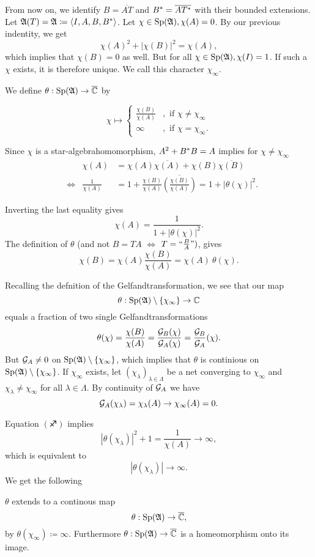 \documentclass[a4paper,10pt]{article}
\begin{document}
From now on, we identify $B=\overline{AT}$ and $B^{*} =\overline{AT^{*}}$  with their bounded extensions.
Let $\mathfrak{A} (T) = \mathfrak{A} \coloneqq \left\langle I, A, B , B^{*} \right\rangle$. Let $ \chi \in \operatorname{Sp} (\mathfrak{A}), \chi(A) =0$. By our previous indentity, we get
\[
 \chi(A)^2 + |\chi(B)|^2 = \chi(A),
\]
which implies that $\chi(B) =0$ as well. But for all $\chi \in \operatorname{Sp} (\mathfrak{A}), \chi(I)=1$. If such a $\chi$ exists, it is therefore unique. We call this character $\chi_\infty$.

We define $\theta : \operatorname{Sp} (\mathfrak{A}) \to \overline{\mathbb{C}}$ by

 \[
 \chi \mapsto 
  \begin{cases}
    \frac{\chi(B)}{\chi(A)} &, \text{ if }\chi \neq \chi_\infty\\
    \infty &, \text{ if } \chi = \chi_\infty.
    \end{cases}
 \]
 
 Since $\chi$ is a star-algebrahomomorphism, $A^2 + B^{*} B = A$ implies for $\chi \neq \chi_\infty$
 \begin{align*}
  &  & \chi(A) &= \chi(A) \overline{\chi(A)} + \chi(B) \overline{\chi(B)} \\
  &\Leftrightarrow& \frac{1}{\chi(A)} &= 1 + \frac{\chi(B)}{\chi(A)} \overline{\left( \frac{\chi(B)}{\chi(A)} \right)} = 1 + | \theta(\chi)|^2. 
 \end{align*}

Inverting the last equality gives
\[
 \chi(A) = \frac{1}{1 + |\theta (\chi)|^2} \tag{\blankone}.
\]
The definition of $\theta$ (and not $B= TA$ $\Leftrightarrow$ $T = `` \frac{B}{A} ")$, gives
\[
 \chi(B) = \chi(A) \frac{\chi(B)}{\chi(A)}= \chi(A)~ \theta(\chi) \tag{\blanktwo}.
\]

Recalling the defnition of the Gelfandtransformation, we see that our map
\[
 \theta : \operatorname{Sp}(\mathfrak{A}) \setminus \{\chi_\infty\} \to \mathbb{C}
\]
equals a fraction of two single Gelfandtransformations
\[
 \theta(\chi) = \frac{\chi(B)}{\chi(A)} = \frac{\mathcal{G}_B (\chi)}{\mathcal{G}_A (\chi)}= \frac{\mathcal{G}_B}{\mathcal{G}_A}(\chi).
\]
But $\mathcal{G}_A \neq 0$ on $\operatorname{Sp}(\mathfrak{A}) \setminus \{\chi_\infty\}$, which implies that $\theta$ is continious on $\operatorname{Sp}(\mathfrak{A}) \setminus \{\chi_\infty\}$.
If $\chi_\infty$ exists, let $ \left( \chi_\lambda \right) _{\lambda \in \Lambda}$ be a net converging to $\chi_\infty$ and $\chi_\lambda \neq \chi_\infty$ for all $\lambda \in \Lambda$. By continuity of $\mathcal{G}_A$ we have
\[
 \mathcal{G}_A (\chi_\lambda) = \chi_\lambda (A) \to \chi_\infty (A) = 0.
\]

Equation $(\sagittarius)$ implies
\[
 | \theta( \chi_\lambda ) | ^2  + 1 = \frac{1}{\chi(A)} \to \infty,
\]
which is equivalent to 
\[
 | \theta (\chi_\lambda ) | \to \infty.
\]
We get the following 
\begin{lem}
$\theta$ extends to a continous map
\[
 \theta : \operatorname{Sp}(\mathfrak{A}) \to \overline{\mathbb{C}},
\]
by $\theta (\chi_\infty) \coloneqq \infty$.
Furthermore $\theta : \operatorname{Sp} (\mathfrak{A}) \to \overline{\mathbb{C}}$ is a homeomorphism onto its image.
\end{lem}
\end{document}
